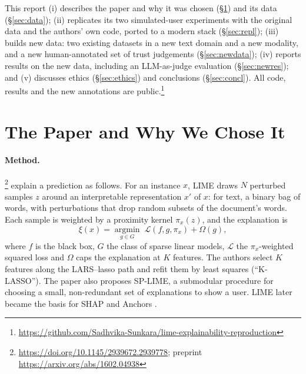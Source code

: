 \documentclass[11pt]{article}
\newcommand{\repo}{\url{https://github.com/Sadhvika-Sunkara/lime-explainability-reproduction}}
\begin{document}
This report (i) describes the paper and why it was chosen (\S\ref{sec:paper}) and its data (\S\ref{sec:data}); (ii) replicates its two simulated-user experiments with the original data and the authors' own code, ported to a modern stack (\S\ref{sec:repl}); (iii) builds new data: two existing datasets in a new text domain and a new modality, and a new human-annotated set of trust judgements (\S\ref{sec:newdata}); (iv) reports results on the new data, including an LLM-as-judge evaluation (\S\ref{sec:newres}); and (v) discusses ethics (\S\ref{sec:ethics}) and conclusions (\S\ref{sec:concl}). All code, results and the new annotations are public.\footnote{\repo}

\section{The Paper and Why We Chose It}
\label{sec:paper}
\paragraph{Method.} \citet{ribeiro2016}\footnote{\url{https://doi.org/10.1145/2939672.2939778}; preprint \url{https://arxiv.org/abs/1602.04938}} explain a prediction as follows. For an instance $x$, LIME draws $N$ perturbed samples $z$ around an interpretable representation $x'$ of $x$: for text, a binary bag of words, with perturbations that drop random subsets of the document's words. Each sample is weighted by a proximity kernel $\pi_x(z)$, and the explanation is
\begin{equation*}
\xi(x)=\operatorname*{argmin}_{g\in G}\;\mathcal{L}(f,g,\pi_x)+\Omega(g),
\end{equation*}
where $f$ is the black box, $G$ the class of sparse linear models, $\mathcal{L}$ the $\pi_x$-weighted squared loss and $\Omega$ caps the explanation at $K$ features. The authors select $K$ features along the LARS--lasso path and refit them by least squares (``K-LASSO''). The paper also proposes SP-LIME, a submodular procedure for choosing a small, non-redundant set of explanations to show a user. LIME later became the basis for SHAP \citep{lundberg2017} and Anchors \citep{ribeiro2018}.
\end{document}

